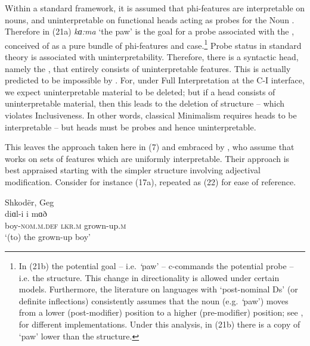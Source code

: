 \documentclass[output=paper]{langsci/langscibook}
\begin{document}
 Within a standard  framework, it is assumed that phi-features are interpretable on nouns, and uninterpretable on functional heads acting as probes for the Noun \citep{Carstens2001}. Therefore in (21a) \textit{kɑ:ma} ‘the paw’ is the goal for a probe associated with the , conceived of as a pure bundle of phi-features and case.\footnote{In (21b) the potential goal – i.e. \textit{‘}paw’ – c-commands the potential probe – i.e. the  structure. This change in directionality is allowed under certain models. Furthermore, the literature on languages with ‘post-nominal Ds’ (or definite inflections) consistently assumes that the noun (e.g. \textit{‘}paw’) moves from a lower (post-modifier) position to a higher (pre-modifier) position; see \citet{Turano2002}, \citet{Dimitrova-Vulchanova1998} for different implementations. Under this analysis, in (21b) there is a copy of ‘paw’ lower than the  structure.} Probe status in standard  theory is associated with uninterpretability. Therefore, there is a syntactic head, namely the , that entirely consists of uninterpretable features. This is actually predicted to be impossible by \citet{Chomsky1995}. For, under Full Interpretation at the C-I interface, we expect uninterpretable material to be deleted; but if a head consists of uninterpretable material, then this leads to the deletion of structure – which violates Inclusiveness. In other words, classical Minimalism requires heads to be interpretable – but  heads must be probes and hence uninterpretable. 

  This leaves the approach taken here in (7) and embraced by \citet{Franco2015}, who assume that  works on sets of features which are uniformly interpretable. Their approach is best appraised starting with the simpler  structure involving adjectival modification. Consider for instance  (17a), repeated as (22) for ease of reference. 

\ea%
    Shkodër, Geg \label{ex:manzini:22}\\
    \gll diɑl-i       i   mɑð       \\
         boy-\textsc{nom.m.def}   \textsc{lkr.m}  grown-up.\textsc{m}  \\
    \glt ‘(to) the grown-up boy’ 
    \z
\end{document}

